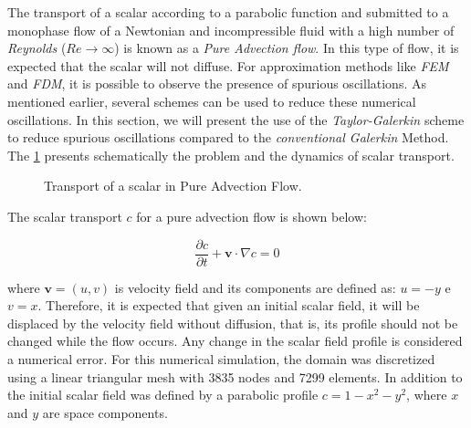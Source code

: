 The transport of a scalar according to a parabolic function and 
submitted to a monophase flow of a Newtonian and incompressible fluid 
with a high number of \textit{Reynolds} 
($\textit{Re} \rightarrow \infty$) is known as a 
\textit{Pure Advection flow}. In this type of flow, 
it is expected that the scalar will not diffuse. 
For approximation methods like \textit{FEM} and \textit{FDM}, 
it is possible to observe the presence of spurious oscillations. 
As mentioned earlier, several schemes can be used to reduce these 
numerical oscillations. In this section, we will present the use 
of the \textit{Taylor-Galerkin} scheme to reduce spurious oscillations 
compared to the \textit{conventional Galerkin} Method. 
The \ref{conveccao} presents schematically the problem and 
the dynamics of scalar transport.

\vspace{0.5cm}
\begin{figure}[H]
\begin{center}
\end{center}
\caption{Transport of a scalar in Pure Advection Flow.}
\label{conveccao}
\end{figure}

\medskip
\noindent
The scalar transport $c$ for a pure advection flow is shown below:


\begin{equation}
 \frac{\partial c}{\partial t} 
 + 
 \textbf{v} \cdot \nabla c
 = 0
\end{equation}

\noindent
where $\textbf{v} = (u,v)$ is velocity field and its components are
defined as: $u = -y$ e $v = x$. 
Therefore, it is expected that given an initial scalar field, 
it will be displaced by the velocity field without diffusion, 
that is, its profile should not be changed while the flow occurs. 
Any change in the scalar field profile is considered a numerical error.
For this numerical simulation, the domain was discretized using a 
linear triangular mesh with 3835 nodes and 7299 elements. 
In addition to the initial scalar field was defined by a parabolic
profile $c = 1 - x^2 - y^2$, where $x$ and $y$ are space components.



